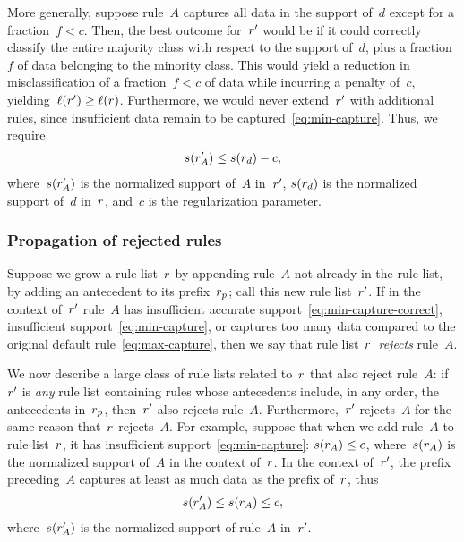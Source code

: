 More generally, suppose rule~$A$ captures all data in the support of~$d$
except for a fraction~${f < c}$.
%
Then, the best outcome for~${r}'$ would be if it could correctly classify
the entire majority class with respect to the support of~$d$,
plus a fraction~$f$ of data belonging to the minority class.
%
This would yield a reduction in misclassification of a fraction~${f < c}$
of data while incurring a penalty of~$c$, yielding~${\ell({r}') \ge \ell({r})}$.
%
Furthermore, we would never extend~${r}'$ with additional rules,
since insufficient data remain to be captured~\eqref{eq:min-capture}.
%
Thus, we require
\begin{align}
s(\RL'_A) \le s(\RL_d) - c,
\label{eq:max-capture}
\end{align}
where~$s({r}'_A)$ is the normalized support of~$A$ in~${r}'$,
$s({r}_d)$ is the normalized support of~$d$ in~${r}$,
and~$c$ is the regularization parameter.

\subsubsection{Propagation of rejected rules}

Suppose we grow a rule list~${r}$ by appending rule~$A$ not already in the rule list,
\ie by adding an antecedent to its prefix~${r_p}$; call this new rule list~${r}'$.
%
If in the context of~${r}'$ rule~$A$ has insufficient accurate support~\eqref{eq:min-capture-correct},
insufficient support~\eqref{eq:min-capture},
or captures too many data compared to the original default rule~\eqref{eq:max-capture},
then we say that rule list~${r}$~\emph{rejects} rule~$A$.

We now describe a large class of rule lists related to~${r}$ that also reject rule~$A$:
if~${r}'$ is \emph{any} rule list containing rules whose antecedents include,
in any order, the antecedents in~${r_p}$, then~${r}'$ also rejects rule~$A$.
%
Furthermore,~${r}'$ rejects~$A$ for the same reason that~${r}$ rejects~$A$.
%
For example, suppose that when we add rule~$A$ to rule list~${r}$,
it has insufficient support~\eqref{eq:min-capture}: ${s({r}_A) \le c}$,
where~$s({r}_A)$ is the normalized support of~$A$ in the context of~${r}$.
%
In the context of~${r}'$, the prefix preceding~$A$ captures at least
as much data as the prefix of~${r}$, thus
\begin{align}
s(\RL'_A) \le s(\RL_A) \le c,
\end{align}
where~$s({r}'_A)$ is the normalized support of rule~$A$ in~${r}'$.

